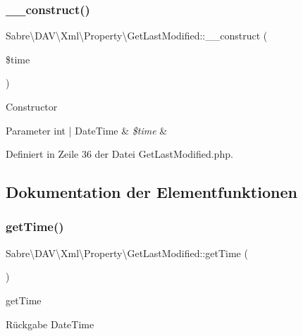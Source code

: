 \subsubsection{\texorpdfstring{\+\_\+\+\_\+construct()}{\_\_construct()}}
{\footnotesize\ttfamily Sabre\textbackslash{}\+D\+A\+V\textbackslash{}\+Xml\textbackslash{}\+Property\textbackslash{}\+Get\+Last\+Modified\+::\+\_\+\+\_\+construct (\begin{DoxyParamCaption}\item[{}]{\$time }\end{DoxyParamCaption})}

Constructor


\begin{DoxyParams}[1]{Parameter}
int | Date\+Time & {\em \$time} & \\
\hline
\end{DoxyParams}


Definiert in Zeile 36 der Datei Get\+Last\+Modified.\+php.



\subsection{Dokumentation der Elementfunktionen}
\mbox{\label{class_sabre_1_1_d_a_v_1_1_xml_1_1_property_1_1_get_last_modified_abd1d7359f75402fb533904a9350a30de}} 
\subsubsection{\texorpdfstring{get\+Time()}{getTime()}}
{\footnotesize\ttfamily Sabre\textbackslash{}\+D\+A\+V\textbackslash{}\+Xml\textbackslash{}\+Property\textbackslash{}\+Get\+Last\+Modified\+::get\+Time (\begin{DoxyParamCaption}{ }\end{DoxyParamCaption})}

get\+Time

\begin{DoxyReturn}{Rückgabe}
Date\+Time 
\end{DoxyReturn}


